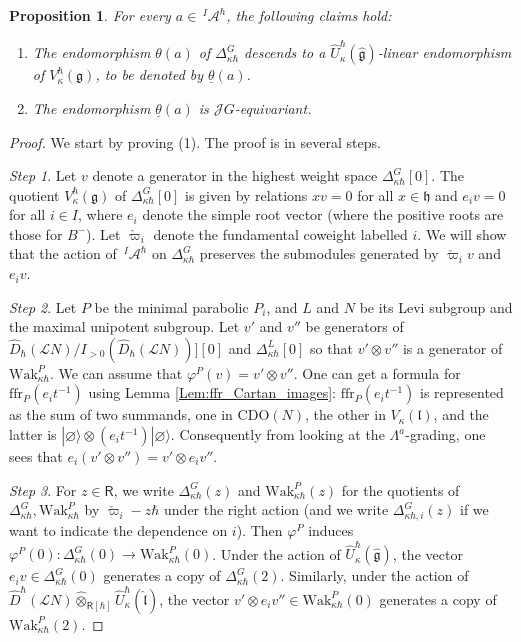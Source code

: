 \documentclass{amsart}
\newtheorem{Prop}[Thm]{Proposition}
\theoremstyle{definition}
\newcommand{\on}{\mathrm}
\newcommand{\Ring}{\mathsf{R}}
\newcommand{\g}{\mathfrak{g}}
\newcommand{\hg}{\hat{\mathfrak{g}}}
\newcommand{\h}{\mathfrak{h}}
\newcommand{\ffr}{\mathrm{ffr}}
\newcommand{\Wak}{\on{Wak}}
\newcommand{\lf}{\mathfrak{l}}
\newcommand{\A}{\mathscr{A}}
\newcommand{\Jet}{\mathscr{J}}
\newcommand{\Loop}{\mathscr{L}}
\newcommand{\CDO}{\mathrm{CDO}}
\numberwithin{equation}{section}
\begin{document}
\begin{Prop}\label{Prop:from_Verma_to_vacuum}
For every $a\in \,^I\!\A^\hbar$, the following claims hold:
\begin{enumerate}
\item The endomorphism $\theta(a)$ of $\Delta^G_{\kappa\hbar}$ descends to a $\widehat{U}^\hbar_\kappa(\hg)$-linear endomorphism of $V^\hbar_\kappa(\g)$, to be denoted by $\underline{\theta}(a)$.
\item The endomorphism $\underline{\theta}(a)$ is $\Jet G$-equivariant.
\end{enumerate}
\end{Prop}
\begin{proof}
We start by proving (1). The proof is in several steps.

{\it Step 1}. Let $v$ denote a generator in the highest weight space $\Delta^G_{\kappa\hbar}[0]$. The quotient $V^\hbar_\kappa(\g)$ of $\Delta^G_{\kappa\hbar}[0]$ is given by relations $xv=0$ for all $x\in \h$
and $e_iv=0$ for all $i\in I$, where $e_i$ denote the simple root vector (where the positive roots are those for $B^-$). Let $\check{\varpi}_i$ denote the fundamental coweight labelled $i$. We will show that the action of 
$\,^I\!\A^\hbar$ on $\Delta^G_{\kappa\hbar}$ preserves the submodules generated by $\check{\varpi}_iv$ and $e_i v$. 

{\it Step 2}. 
Let $P$ be the minimal parabolic $P_i$,
and $L$ and $N$ be its Levi subgroup and the maximal unipotent subgroup. 
Let $v'$ and $v''$ be generators of 
$\widehat{D}_\hbar(\Loop N)/I_{>0}(\widehat{D}_\hbar(\Loop N))][0]$ and $\Delta_{\kappa\hbar}^{L}[0]$ so that $v'\otimes v''$ is a generator 
of $\Wak^P_{\kappa\hbar}$. We can assume that $\varphi^P(v)=v'\otimes v''$. 
One can get a formula for $\ffr_P(e_it^{-1})$ using Lemma 
\ref{Lem:ffr_Cartan_images}: $\ffr_P(e_it^{-1})$ is represented as the sum of two summands, one in $\CDO(N)$, the other in $V_\kappa(\lf)$, and the latter is $|\varnothing\rangle\otimes (e_it^{-1})|\varnothing\rangle$. Consequently from looking at the $\Lambda^a$-grading, one sees that $e_i(v'\otimes v'')=v'\otimes e_i v''$. 

{\it Step 3}. 
For $z\in \Ring$, we write $\Delta^G_{\kappa\hbar}(z)$ and $\Wak^P_{\kappa\hbar}(z)$ for the quotients of $\Delta^G_{\kappa\hbar}, \Wak^P_{\kappa\hbar}$ by  
$\check{\varpi}_i-z\hbar$ under the right action (and we write 
$\Delta^G_{\kappa\hbar,i}(z)$ if we want to indicate the dependence on $i$). Then $\varphi^P$ induces 
$\varphi^P(0):\Delta^G_{\kappa\hbar}(0)\rightarrow \Wak^P_{\kappa\hbar}(0)$. 
Under the action of $\widehat{U}^\hbar_{\kappa}(\hg)$, the vector $e_iv\in \Delta^G_{\kappa\hbar}(0)$ generates a copy of $\Delta^G_{\kappa\hbar}(2)$.
Similarly, under the action of $\widehat{D}^\hbar(\Loop N)\widehat{\otimes}_{\Ring[\hbar]}\widehat{U}^\hbar_\kappa(\hat{\lf})$, 
the vector $v'\otimes e_iv''\in \Wak^P_{\kappa\hbar}(0)$ generates a copy of $\Wak^P_{\kappa\hbar}(2)$. 


\end{proof}
\end{document}
